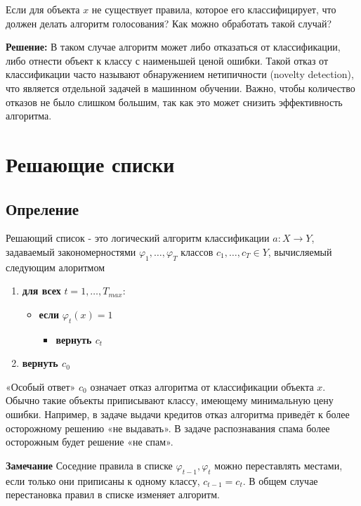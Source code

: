 Если для объекта $x$ не существует правила, которое его классифицирует, что должен делать алгоритм голосования? Как можно обработать такой случай?

\textbf{Решение:}  
В таком случае алгоритм может либо отказаться от классификации, либо отнести объект к классу с наименьшей ценой ошибки. Такой отказ от классификации часто называют обнаружением нетипичности (novelty detection), что является отдельной задачей в машинном обучении. Важно, чтобы количество отказов не было слишком большим, так как это может снизить эффективность алгоритма.

\section{Решающие списки}
\subsection{Опреление}
    Решающий список - это логический алгоритм классификации $a: X \xrightarrow{} Y$, задаваемый закономерностями $\varphi_1, \dots, \varphi_T$ классов $c_1, \dots, c_T \in Y$, вычисляемый следующим алоритмом

\hline
\begin{enumerate}
    \item \textbf{для всех} $t = 1, \dots, T_{max}$:
    \begin{itemize}
        \item \textbf{если} $\varphi_t(x) = 1$ 
        \begin{itemize}
            \item \textbf{вернуть $c_t$}
        \end{itemize}
    \end{itemize}
    
    \item \textbf{вернуть $c_0$}
\end{enumerate}
\hline
«Особый ответ» $c_0$ означает отказ алгоритма от классификации объекта $x$.
Обычно такие объекты приписывают классу, имеющему минимальную цену ошибки.
Например, в задаче выдачи кредитов отказ алгоритма приведёт к более осторожному решению «не выдавать». В задаче распознавания спама более осторожным будет
решение «не спам».

\textbf{Замечание} Соседние правила в списке $\varphi_{t-1}, \varphi_t$ можно переставлять местами,
если только они приписаны к одному классу, $c_{t-1} = c_t$. В общем случае перестановка
правил в списке изменяет алгоритм.

